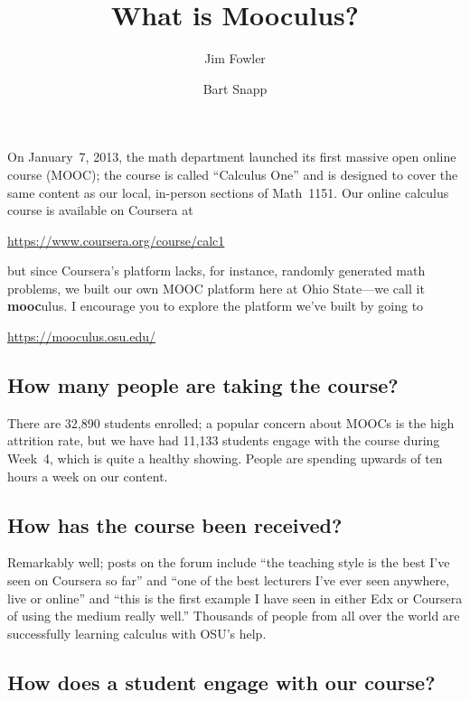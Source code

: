 \documentclass[12pt]{amsart}
\title{What is Mooculus?}
\author{Jim Fowler \and Bart Snapp}
\newcommand{\mooculus}{\textsf{\textbf{mooc}ulus}}
\begin{document}
\maketitle

On January~7, 2013, the math department launched its first massive
open online course (MOOC); the course is called ``Calculus One'' and
is designed to cover the same content as our local, in-person sections
of Math~1151.  Our online calculus course is available on Coursera at
\begin{center}
\url{https://www.coursera.org/course/calc1}
\end{center}
but since Coursera's platform lacks, for instance, randomly generated
math problems, we built our own MOOC platform here at Ohio State---we
call it \mooculus.  I encourage you to explore the platform we've
built by going to
\begin{center}
\url{https://mooculus.osu.edu/}
\end{center}

\subsection*{How many people are taking the course?}

There are 32,890 students enrolled; a popular concern about MOOCs is
the high attrition rate, but we have had 11,133 students engage with
the course during Week~4, which is quite a healthy showing.  People
are spending upwards of ten hours a week on our content.

\subsection*{How has the course been received?}

Remarkably well; posts on the forum include ``the teaching style is
the best I've seen on Coursera so far'' and ``one of the best
lecturers I've ever seen anywhere, live or online'' and ``this is the
first example I have seen in either Edx or Coursera of using the
medium really well.''  Thousands of people from all over the world are
successfully learning calculus with OSU's help.

\subsection*{How does a student engage with our course?}
\end{document}
